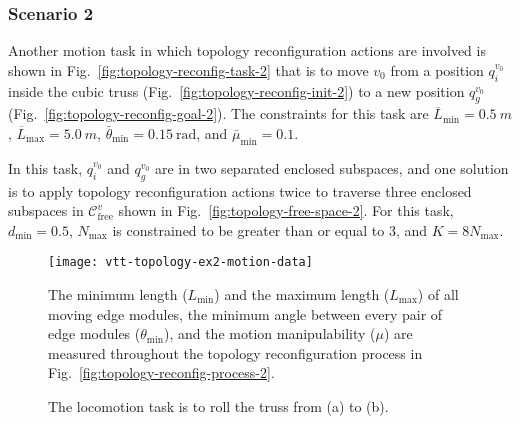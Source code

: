 \documentclass[journal]{IEEEtran}
\begin{document}
\subsubsection{Scenario 2}

Another motion task in which topology reconfiguration actions are
involved is shown in Fig.~\ref{fig:topology-reconfig-task-2} that is
to move $v_0$ from a position $q_i^{v_0}$ inside the cubic truss
(Fig.~\ref{fig:topology-reconfig-init-2}) to a new position
$q_g^{v_0}$ (Fig.~\ref{fig:topology-reconfig-goal-2}). The constraints
for this task are $\overline{L}_{\min}=\SI{0.5}{m}$,
$\overline{L}_{\max}=\SI{5.0}{m}$,
$\bar{\theta}_{\min}=\SI{0.15}{\radian}$, and $\bar{\mu}_{\min}=0.1$.

In this task, $q_i^{v_0}$ and $q_g^{v_0}$ are in two separated
enclosed subspaces, and one solution is to apply topology
reconfiguration actions twice to traverse three enclosed subspaces in
$\mathcal{C}_{\mathrm{free}}^v$ shown in
Fig.~\ref{fig:topology-free-space-2}. For this task, $d_{\min}=0.5$,
$N_{\max}$ is constrained to be greater than or equal to $3$, and
$K=8N_{\max}$.

\begin{figure}[t!]
  \centering
  \texttt{[image: vtt-topology-ex2-motion-data]}
  \caption{The minimum length ($L_{\min}$) and the maximum length
    ($L_{\max}$) of all moving edge modules, the minimum angle between
    every pair of edge modules ($\theta_{\min}$), and the motion
    manipulability ($\mu$) are measured throughout the topology
    reconfiguration process in
    Fig.~\ref{fig:topology-reconfig-process-2}.}
  \label{fig:topology-test2-data}
\end{figure}

\begin{figure}[t!]
  \centering
  \caption{The locomotion task is to roll the truss from (a) to (b).}
\end{figure}
\end{document}
